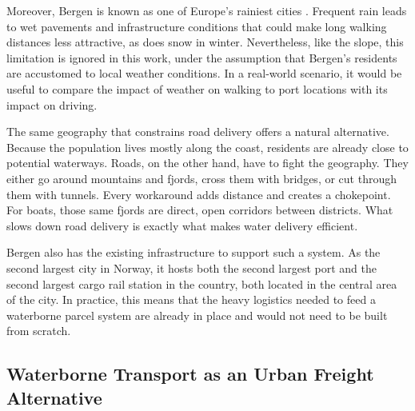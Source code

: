 \documentclass[12pt]{article}
\begin{document}
Moreover, Bergen is known as one of Europe's rainiest cities \parencite{BREMER2020100236}. Frequent rain leads to wet pavements and infrastructure conditions that could make long walking distances less attractive, as does snow in winter. Nevertheless, like the slope, this limitation is ignored in this work, under the assumption that Bergen's residents are accustomed to local weather conditions. In a real-world scenario, it would be useful to compare the impact of weather on walking to port locations with its impact on driving.

The same geography that constrains road delivery offers a natural alternative. Because the population lives mostly along the coast, residents are already close to potential waterways. Roads, on the other hand, have to fight the geography. They either go around mountains and fjords, cross them with bridges, or cut through them with tunnels. Every workaround adds distance and creates a chokepoint. For boats, those same fjords are direct, open corridors between districts. What slows down road delivery is exactly what makes water delivery efficient.

Bergen also has the existing infrastructure to support such a system. As the second largest city in Norway, it hosts both the second largest port \parencite{bergenport} and the second largest cargo rail station \parencite{bergenrail} in the country, both located in the central area of the city. In practice, this means that the heavy logistics needed to feed a waterborne parcel system are already in place and would not need to be built from scratch.

\subsection{Waterborne Transport as an Urban Freight Alternative}
\label{subsec:waterborne-urban-freight}
\end{document}
